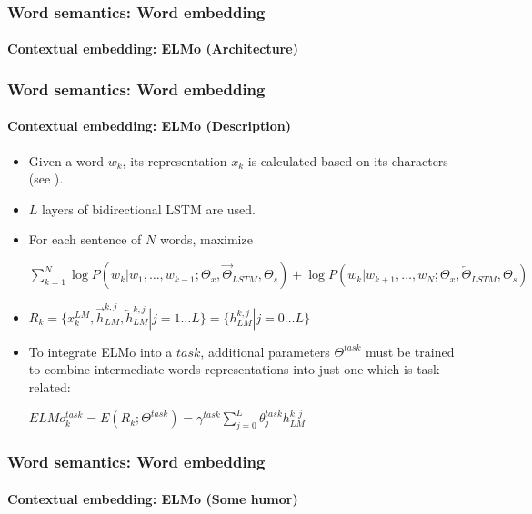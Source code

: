 \documentclass[xcolor=table]{beamer}
\begin{document}
\begin{frame}
\frametitle{Word semantics: Word embedding}
\framesubtitle{Contextual embedding: ELMo (Architecture)}
	
	\begin{center}
	\end{center}
	
\end{frame}

\begin{frame}
\frametitle{Word semantics: Word embedding}
\framesubtitle{Contextual embedding: ELMo (Description)}

\begin{itemize}
	\item Given a word $w_k$, its representation $x_k$ is calculated based on its characters (see \cite{2015-kim-al}).
	\item $L$ layers of bidirectional LSTM are used. 
	\item For each sentence of $N$ words, maximize\\ 
	\begin{center}
		$\sum_{k=1}^{N} 
	\log P(w_k | w_1,\ldots,w_{k-1}; \Theta_x, \overrightarrow{\Theta}_{LSTM}, \Theta_s)
	+
	\log P(w_k | w_{k+1},\ldots,w_{N}; \Theta_x, \overleftarrow{\Theta}_{LSTM}, \Theta_s)
	$
	\end{center}
	
	\item $R_k = \{x_k^{LM}, \overrightarrow{h}_{LM}^{k, j}, \overleftarrow{h}_{LM}^{k, j} | j= 1 \ldots L \}
	= \{h_{LM}^{k, j} | j= 0 \ldots L \}
	$
	
	\item To integrate ELMo into a $task$, additional parameters $\Theta^{task}$ must be trained to combine intermediate words representations into just one which is task-related:\\
	\begin{center}
		$ELMo_k^{task} = E(R_k; \Theta^{task}) = \gamma^{task} \sum_{j=0}^{L} \theta_j^{task} h_{LM}^{k, j}$
	\end{center}
\end{itemize}

\end{frame}

\begin{frame}
\frametitle{Word semantics: Word embedding}
\framesubtitle{Contextual embedding: ELMo (Some humor)}

\begin{center}
\end{center}
	
\end{frame}
\end{document}
